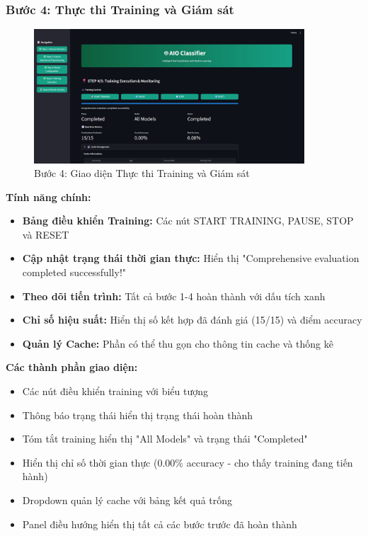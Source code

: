 \subsubsection{Bước 4: Thực thi Training và Giám sát}

\begin{figure}[H]
    \centering
    \includegraphics[width=0.9\textwidth]{image/Step 4.jpg}
    \caption{Bước 4: Giao diện Thực thi Training và Giám sát}
    \label{fig:step4}
\end{figure}

\textbf{Tính năng chính:}
\begin{itemize}
    \item \textbf{Bảng điều khiển Training:} Các nút START TRAINING, PAUSE, STOP và RESET
    \item \textbf{Cập nhật trạng thái thời gian thực:} Hiển thị "Comprehensive evaluation completed successfully!"
    \item \textbf{Theo dõi tiến trình:} Tất cả bước 1-4 hoàn thành với dấu tích xanh
    \item \textbf{Chỉ số hiệu suất:} Hiển thị số kết hợp đã đánh giá (15/15) và điểm accuracy
    \item \textbf{Quản lý Cache:} Phần có thể thu gọn cho thông tin cache và thống kê
\end{itemize}

\textbf{Các thành phần giao diện:}
\begin{itemize}
    \item Các nút điều khiển training với biểu tượng
    \item Thông báo trạng thái hiển thị trạng thái hoàn thành
    \item Tóm tắt training hiển thị "All Models" và trạng thái "Completed"
    \item Hiển thị chỉ số thời gian thực (0.00\% accuracy - cho thấy training đang tiến hành)
    \item Dropdown quản lý cache với bảng kết quả trống
    \item Panel điều hướng hiển thị tất cả các bước trước đã hoàn thành
\end{itemize}

